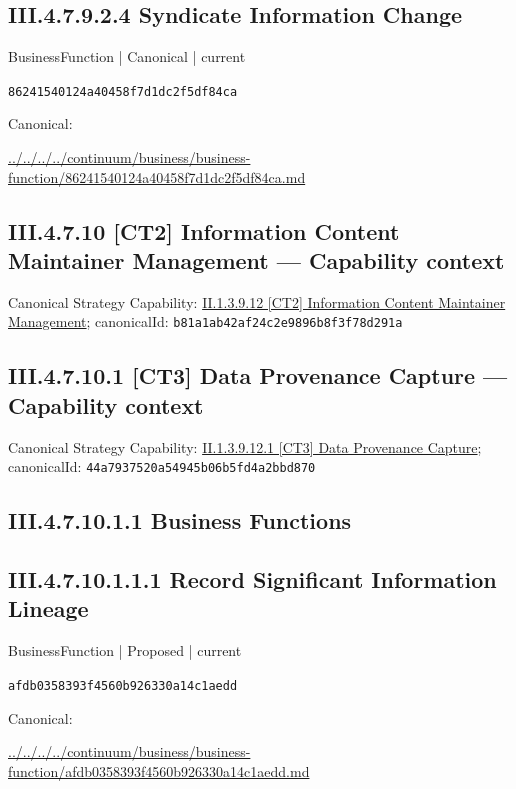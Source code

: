 \documentclass[10pt,a4paper]{article}
\begin{document}
\subsection*{III.4.7.9.2.4 Syndicate Information Change}
\label{element-86241540124a40458f7d1dc2f5df84ca}
{\small BusinessFunction | Canonical | current}\par
\texttt{86241540124a40458f7d1dc2f5df84ca}\par
Canonical: \par
{\footnotesize\url{../../../../continuum/business/business-function/86241540124a40458f7d1dc2f5df84ca.md}}\par
\subsection*{III.4.7.10 [CT2] Information Content Maintainer Management — Capability context}
Canonical Strategy Capability: \hyperref[element-b81a1ab42af24c2e9896b8f3f78d291a]{II.1.3.9.12 [CT2] Information Content Maintainer Management}; canonicalId: \texttt{b81a1ab42af24c2e9896b8f3f78d291a}\par
\subsection*{III.4.7.10.1 [CT3] Data Provenance Capture — Capability context}
Canonical Strategy Capability: \hyperref[element-44a7937520a54945b06b5fd4a2bbd870]{II.1.3.9.12.1 [CT3] Data Provenance Capture}; canonicalId: \texttt{44a7937520a54945b06b5fd4a2bbd870}\par
\subsection*{III.4.7.10.1.1 Business Functions}
\subsection*{III.4.7.10.1.1.1 Record Significant Information Lineage}
\label{element-afdb0358393f4560b926330a14c1aedd}
{\small BusinessFunction | Proposed | current}\par
\texttt{afdb0358393f4560b926330a14c1aedd}\par
Canonical: \par
{\footnotesize\url{../../../../continuum/business/business-function/afdb0358393f4560b926330a14c1aedd.md}}\par
\end{document}
